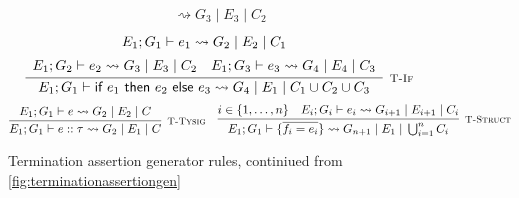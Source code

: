 \begin{figure}[]
\[{\begin{array}{c}
                    \rightsquigarrow G_3\; |\; E_3\; |\; C_2
            \end{array}
        }
    \]
    \vspace{0.5pt}
    \[
        \infer[\textsc{\footnotesize T-If}]{
            E_1; G_1 \vdash \textsf{if } e_1 \textsf{ then } e_2 \textsf{ else } e_3
                \rightsquigarrow G_4\; |\; E_1\; |\; C_1 \cup C_2 \cup C_3
        }{
            \begin{array}{c}
                E_1; G_1 \vdash e_1 \rightsquigarrow G_2\; |\; E_2\; |\; C_1 \\[5pt]
                E_1; G_2 \vdash e_2 \rightsquigarrow G_3\; |\; E_3\; |\; C_2
                \hspace{1em}
                E_1; G_3 \vdash e_3 \rightsquigarrow G_4\; |\; E_4\; |\; C_3
            \end{array}
        }
    \]
    \vspace{0.5pt}
    \[
        \infer[\textsc{\footnotesize T-Tysig}]{
            E_1; G_1 \vdash e :: \tau
                \rightsquigarrow G_2\; |\; E_1\; |\; C
        }{
            E_1; G_1 \vdash e \rightsquigarrow G_2\; |\; E_2\; |\; C
        }
        \hspace{1em}
        \infer[\textsc{\footnotesize T-Struct}]{
            E_1; G_1 \vdash \{\overline{f_i = e_i}\}
                \rightsquigarrow G_{n+1}\; |\; E_1\; |\; \bigcup_{i = 1}^n C_i
        }{
            i \in \{1, \dots, n\}\quad  E_i; G_i \vdash e_i 
                \rightsquigarrow G_{i+1}\; |\; E_{i+1}\; |\; C_i
        }
    \]
    
    \caption{Termination assertion generator rules,
             continiued from \autoref{fig:terminationassertiongen}}
    \label{fig:terminationassertiongen2}
\end{figure}

